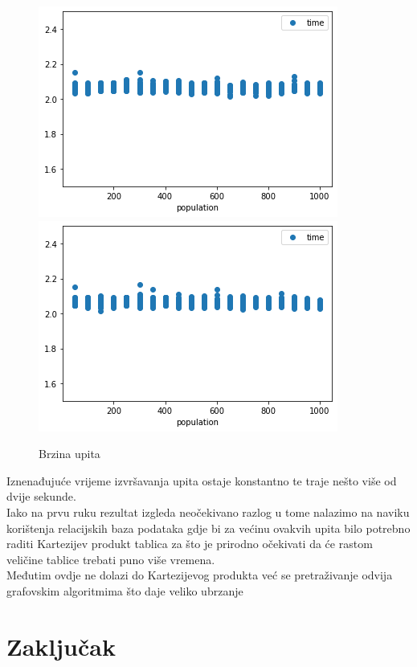 \documentclass[titlepage, 12pt]{scrartcl}
\begin{document}
\begin{figure}[h]
    \centering
    \includegraphics[scale=0.5]{slike/personal_graph.png}
    \includegraphics[scale=0.5]{slike/business_graph.png}
    \caption{Brzina upita}
    \label{fig:query_speed}
\end{figure}


Iznenađujuće vrijeme izvršavanja upita ostaje konstantno te traje nešto više od dvije sekunde. \\
Iako na prvu ruku rezultat izgleda neočekivano razlog u tome nalazimo na naviku korištenja relacijskih baza podataka gdje bi za većinu ovakvih upita bilo potrebno raditi Kartezijev produkt tablica za što je prirodno očekivati da će rastom veličine tablice trebati puno više vremena. \\
Međutim ovdje ne dolazi do Kartezijevog produkta već se pretraživanje odvija grafovskim algoritmima što daje veliko ubrzanje 


\newpage
\section{Zaključak}
\end{document}
